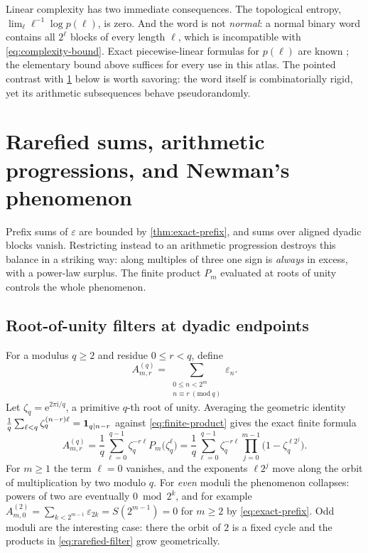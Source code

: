 \documentclass[11pt,oneside]{article}
\numberwithin{equation}{section}
\theoremstyle{definition}
\theoremstyle{remark}
\newcommand{\e}{\mathrm e}
\newcommand{\ii}{\mathrm i}
\newcommand{\eps}{\varepsilon}
\newcommand{\ind}{\mathbf 1}
\begin{document}
Linear complexity has two immediate consequences.  The topological entropy,
\(\lim_\ell\ell^{-1}\log p(\ell)\), is zero.  And the word is not
\emph{normal}: a normal binary word contains all \(2^\ell\) blocks of every
length \(\ell\), which is incompatible with \eqref{eq:complexity-bound}.
Exact piecewise-linear formulas for \(p(\ell)\) are known
\cite{alloucheShallit2003}; the elementary bound above suffices for every
use in this atlas.  The pointed contrast with \cref{sec:rarefied-newman}
below is worth savoring: the word itself is combinatorially rigid, yet its
arithmetic subsequences behave pseudorandomly.

\section[Rarefied sums and Newman's phenomenon]{Rarefied sums, arithmetic progressions, and Newman's phenomenon}
\label{sec:rarefied-newman}

Prefix sums of \(\eps\) are bounded by \cref{thm:exact-prefix}, and sums
over aligned dyadic blocks vanish.  Restricting instead to an arithmetic
progression destroys this balance in a striking way: along multiples of
three one sign is \emph{always} in excess, with a power-law surplus.  The
finite product \(P_m\) evaluated at roots of unity controls the whole
phenomenon.

\subsection{Root-of-unity filters at dyadic endpoints}

For a modulus \(q\ge2\) and residue \(0\le r<q\), define
\begin{equation}
  A^{(q)}_{m,r}
  =\sum_{\substack{0\le n<2^m\\ n\equiv r\ (\mathrm{mod}\ q)}}\eps_n.
  \label{eq:rarefied-definition}
\end{equation}
Let \(\zeta_q=\e^{2\pi\ii/q}\), a primitive \(q\)-th root of unity.
Averaging the geometric identity
\(\smash{\frac1q\sum_{\ell<q}\zeta_q^{(n-r)\ell}}=\ind_{q\mid n-r}\)
against \eqref{eq:finite-product} gives the exact finite formula
\begin{equation}
  \boxed{
  A^{(q)}_{m,r}
  =\frac1q\sum_{\ell=0}^{q-1}\zeta_q^{-r\ell}
   P_m\bigl(\zeta_q^{\ell}\bigr)
  =\frac1q\sum_{\ell=0}^{q-1}\zeta_q^{-r\ell}
   \prod_{j=0}^{m-1}\bigl(1-\zeta_q^{\ell2^j}\bigr).}
  \label{eq:rarefied-filter}
\end{equation}
For \(m\ge1\) the term \(\ell=0\) vanishes, and the exponents
\(\ell2^j\) move along the orbit of multiplication by two modulo \(q\).
For \emph{even} moduli the phenomenon collapses: powers of two are
eventually \(0\bmod 2^k\), and for example
\(A^{(2)}_{m,0}=\sum_{k<2^{m-1}}\eps_{2k}=S(2^{m-1})=0\) for \(m\ge2\) by
\eqref{eq:exact-prefix}.  Odd moduli are the interesting case: there the
orbit of \(2\) is a fixed cycle and the products in
\eqref{eq:rarefied-filter} grow geometrically.
\end{document}
